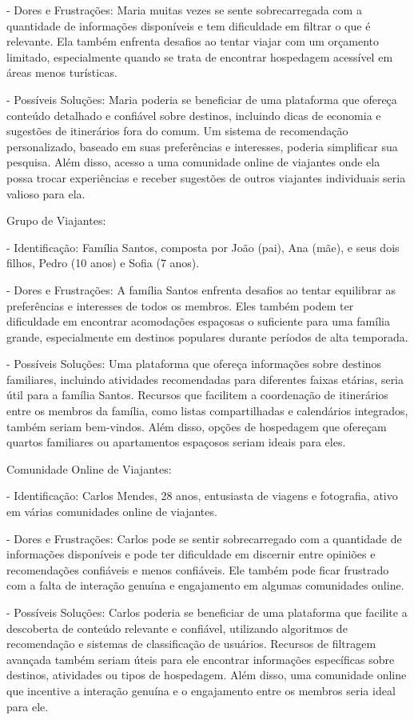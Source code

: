\documentclass{article}
\begin{document}
- Dores e Frustrações: Maria muitas vezes se sente sobrecarregada com a quantidade de informações disponíveis e tem dificuldade em filtrar o que é relevante. Ela também enfrenta desafios ao tentar viajar com um orçamento limitado, especialmente quando se trata de encontrar hospedagem acessível em áreas menos turísticas.

- Possíveis Soluções: Maria poderia se beneficiar de uma plataforma que ofereça conteúdo detalhado e confiável sobre destinos, incluindo dicas de economia e sugestões de itinerários fora do comum. Um sistema de recomendação personalizado, baseado em suas preferências e interesses, poderia simplificar sua pesquisa. Além disso, acesso a uma comunidade online de viajantes onde ela possa trocar experiências e receber sugestões de outros viajantes individuais seria valioso para ela.

\bigskip
Grupo de Viajantes:

- Identificação: Família Santos, composta por João (pai), Ana (mãe), e seus dois filhos, Pedro (10 anos) e Sofia (7 anos).

- Dores e Frustrações: A família Santos enfrenta desafios ao tentar equilibrar as preferências e interesses de todos os membros. Eles também podem ter dificuldade em encontrar acomodações espaçosas o suficiente para uma família grande, especialmente em destinos populares durante períodos de alta temporada.

- Possíveis Soluções: Uma plataforma que ofereça informações sobre destinos familiares, incluindo atividades recomendadas para diferentes faixas etárias, seria útil para a família Santos. Recursos que facilitem a coordenação de itinerários entre os membros da família, como listas compartilhadas e calendários integrados, também seriam bem-vindos. Além disso, opções de hospedagem que ofereçam quartos familiares ou apartamentos espaçosos seriam ideais para eles.

\bigskip
Comunidade Online de Viajantes:

- Identificação: Carlos Mendes, 28 anos, entusiasta de viagens e fotografia, ativo em várias comunidades online de viajantes.

- Dores e Frustrações: Carlos pode se sentir sobrecarregado com a quantidade de informações disponíveis e pode ter dificuldade em discernir entre opiniões e recomendações confiáveis e menos confiáveis. Ele também pode ficar frustrado com a falta de interação genuína e engajamento em algumas comunidades online.

- Possíveis Soluções: Carlos poderia se beneficiar de uma plataforma que facilite a descoberta de conteúdo relevante e confiável, utilizando algoritmos de recomendação e sistemas de classificação de usuários. Recursos de filtragem avançada também seriam úteis para ele encontrar informações específicas sobre destinos, atividades ou tipos de hospedagem. Além disso, uma comunidade online que incentive a interação genuína e o engajamento entre os membros seria ideal para ele.
\end{document}
